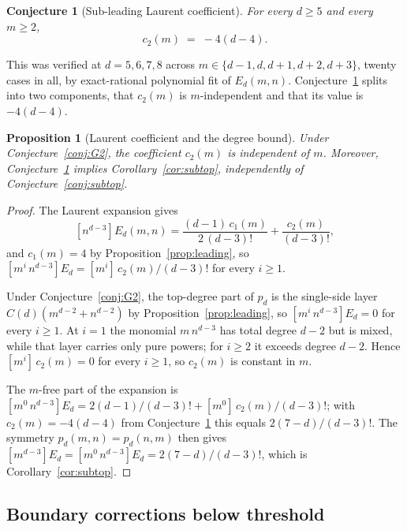 \documentclass[11pt]{article}
\newtheorem{proposition}[theorem]{Proposition}
\newtheorem{conjecture}[theorem]{Conjecture}
\theoremstyle{definition}
\theoremstyle{remark}
\begin{document}
\begin{conjecture}[Sub-leading Laurent coefficient]\label{conj:c2}
For every $d\ge5$ and every $m\ge2$,
\[
  c_2(m) \;=\; -4(d-4).
\]
\end{conjecture}

This was verified at $d=5,6,7,8$ across $m\in\{d-1,d,d+1,d+2,d+3\}$, twenty
cases in all, by exact-rational polynomial fit of $E_d(m,n)$.
Conjecture~\ref{conj:c2} splits into two components, that $c_2(m)$ is
$m$-independent and that its value is $-4(d-4)$.

\begin{proposition}[Laurent coefficient and the degree bound]\label{prop:laurentrel}
Under Conjecture~\ref{conj:G2}, the coefficient $c_2(m)$ is independent of $m$.
Moreover, Conjecture~\ref{conj:c2} implies Corollary~\ref{cor:subtop},
independently of Conjecture~\ref{conj:subtop}.
\end{proposition}

\begin{proof}
The Laurent expansion gives
\[
  [n^{d-3}]E_d(m,n) = \frac{(d-1)\,c_1(m)}{2\,(d-3)!} + \frac{c_2(m)}{(d-3)!},
\]
and $c_1(m)=4$ by Proposition~\ref{prop:leading}, so
$[m^i\,n^{d-3}]E_d = [m^i]\,c_2(m)/(d-3)!$ for every $i\ge1$.

\medskip\noindent
Under Conjecture~\ref{conj:G2}, the top-degree part of $p_d$ is the
single-side layer $C(d)(m^{d-2}+n^{d-2})$ by Proposition~\ref{prop:leading}, so
$[m^i\,n^{d-3}]E_d = 0$ for every $i\ge1$. At $i=1$ the monomial $m\,n^{d-3}$
has total degree $d-2$ but is mixed, while that layer carries only pure powers;
for $i\ge2$ it exceeds degree $d-2$. Hence $[m^i]\,c_2(m)=0$ for
every $i\ge1$, so $c_2(m)$ is constant in $m$.

\medskip\noindent
The $m$-free part of the expansion is
$[m^0\,n^{d-3}]E_d = 2(d-1)/(d-3)! + [m^0]\,c_2(m)/(d-3)!$; with
$c_2(m)=-4(d-4)$ from Conjecture~\ref{conj:c2} this equals $2(7-d)/(d-3)!$.
The symmetry $p_d(m,n)=p_d(n,m)$ then gives
$[m^{d-3}]E_d = [m^0\,n^{d-3}]E_d = 2(7-d)/(d-3)!$, which is
Corollary~\ref{cor:subtop}.
\end{proof}

\subsection{Boundary corrections below threshold}\label{subsec:below}
\end{document}
